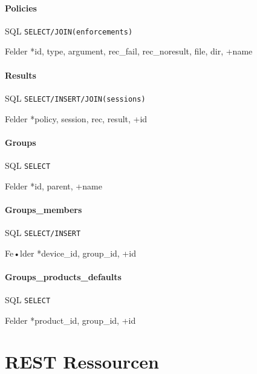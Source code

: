 \documentclass[10pt,a4paper]{scrartcl}
\begin{document}
\paragraph{Policies}
\begin{description*}
	\item[SQL] \texttt{SELECT/JOIN(enforcements)}
	\item[Felder] *id, type, argument, rec\_fail, rec\_noresult, file, dir, +name
\end{description*}

\paragraph{Results}
\begin{description*}
	\item[SQL] \texttt{SELECT/INSERT/JOIN(sessions)}
	\item[Felder] *policy, session, rec, result, +id
\end{description*}

\paragraph{Groups}
\begin{description*}
	\item[SQL] \texttt{SELECT}
	\item[Felder] *id, parent, +name
\end{description*}

\paragraph{Groups\_members}
\begin{description*}
	\item[SQL] \texttt{SELECT/INSERT}
	\item[Fe•lder] *device\_id, group\_id, +id
\end{description*}

\paragraph{Groups\_products\_defaults}
\begin{description*}
	\item[SQL] \texttt{SELECT}
	\item[Felder] *product\_id, group\_id, +id
\end{description*} 


\pagebreak
\section{REST Ressourcen}
\end{document}
